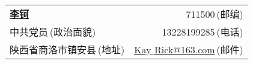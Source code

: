 \newcommand{\myheader}{
\begin{tabular*}{\textwidth}{l@{\extracolsep{\fill}}r}
  \textbf{\href{https://github.com/Kay-Rick}{\LARGE 李钶}} & 711500$\,${\color{labelgrey}(邮编)} \\%
  中共党员$\,${\color{labelgrey}(政治面貌)} & 13228199285$\,${\color{labelgrey}(电话)} \\
  陕西省商洛市镇安县$\,${\color{labelgrey}(地址)} & 
  \href{mailto:Kay_Rick@163.com}{Kay$\_$Rick@163.com}$\,${\color{labelgrey}(邮件)} \\
 
  \end{tabular*}\\\vspace{0.1in}}

\myheader 